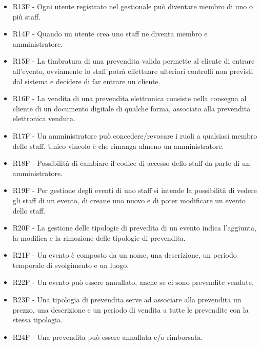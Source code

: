 \documentclass[a4paper]{article}
\begin{document}
\begin{itemize}
	\item R13F - Ogni utente registrato nel gestionale può diventare membro di uno o più staff. 
	
	\item R14F - Quando un utente crea uno staff ne diventa membro e amministratore.
	
	\item R15F - La timbratura di una prevendita valida permette al cliente di entrare all'evento, ovviamente lo staff potrà effettuare ulteriori controlli non previsti dal sistema e decidere di far entrare un cliente.
	
	
	\item R16F - La vendita di una prevendita elettronica consiste nella consegna al cliente di un documento digitale di qualche forma, associato alla prevendita elettronica venduta.

	
	\item R17F - Un amministratore può concedere/revocare i ruoli a qualsiasi membro dello staff. Unico vincolo è che rimanga almeno un amministratore.
	\item R18F - Possibilità di cambiare il codice di accesso dello staff da parte di un amministratore.
	   
	\item R19F - Per gestione degli eventi di uno staff si intende la possibilità di vedere gli staff di un evento, di creane uno nuovo e di poter modificare un evento dello staff.
		
	\item R20F - La gestione delle tipologie di prevedita di un evento indica l'aggiunta, la modifica e la rimozione delle tipologie di prevendita.
	
	\item R21F - Un evento è composto da un nome, una descrizione, un periodo temporale di svolgimento e un luogo. 
	\item R22F - Un evento può essere annullato, anche se ci sono prevendite vendute.
	
	\item R23F - Una tipologia di prevendita serve ad associare alla prevendita un prezzo, una descrizione e un periodo di vendita a tutte le prevendite con la stessa tipologia.

	\item R24F - Una prevendita può essere annullata e/o rimborsata. 
	

\end{itemize}
\end{document}
